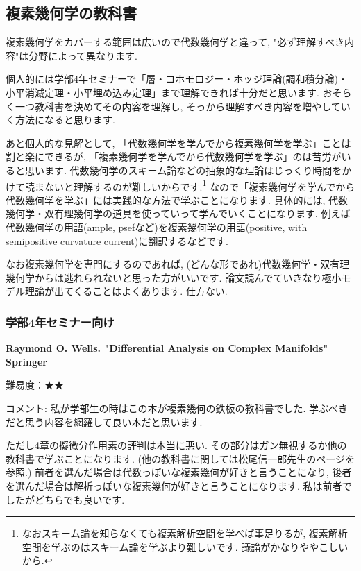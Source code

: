 \subsection{複素幾何学の教科書}
複素幾何学をカバーする範囲は広いので代数幾何学と違って, "必ず理解すべき内容"は分野によって異なります.  

個人的には学部4年セミナーで「層・コホモロジー・ホッジ理論(調和積分論)・小平消滅定理・小平埋め込み定理」まで理解できれば十分だと思います. 
おそらく一つ教科書を決めてその内容を理解し, そっから理解すべき内容を増やしていく方法になると思ります. 

あと個人的な見解として, 「代数幾何学を学んでから複素幾何学を学ぶ」ことは割と楽にできるが, 「複素幾何学を学んでから代数幾何学を学ぶ」のは苦労がいると思います. 代数幾何学のスキーム論などの抽象的な理論はじっくり時間をかけて読まないと理解するのが難しいからです.\footnote{なおスキーム論を知らなくても複素解析空間を学べば事足りるが, 複素解析空間を学ぶのはスキーム論を学ぶより難しいです. 議論がかなりややこしいから. } 
なので「複素幾何学を学んでから代数幾何学を学ぶ」には実践的な方法で学ぶことになります. 
具体的には, 代数幾何学・双有理幾何学の道具を使っていって学んでいくことになります. 
例えば代数幾何学の用語(ample, psefなど)を複素幾何学の用語(positive, with semipositive curvature current)に翻訳するなどです. 

なお複素幾何学を専門にするのであれば, (どんな形であれ)代数幾何学・双有理幾何学からは逃れられないと思った方がいいです. 論文読んでていきなり極小モデル理論が出てくることはよくあります. 仕方ない.  

\subsubsection{学部4年セミナー向け}


\textbf{Raymond O. Wells. "Differential Analysis on Complex Manifolds" Springer}  \vspace{-6pt}

難易度：★★　\vspace{-6pt}

コメント: 私が学部生の時はこの本が複素幾何の鉄板の教科書でした. 学ぶべきだと思う内容を網羅して良い本だと思います. 

ただし4章の擬微分作用素の評判は本当に悪い. その部分はガン無視するか他の教科書で学ぶことになります. (他の教科書に関しては松尾信一郎先生のページを参照.)
前者を選んだ場合は代数っぽいな複素幾何が好きと言うことになり, 後者を選んだ場合は解析っぽいな複素幾何が好きと言うことになります. 私は前者でしたがどちらでも良いです. 
\vspace{8pt}

